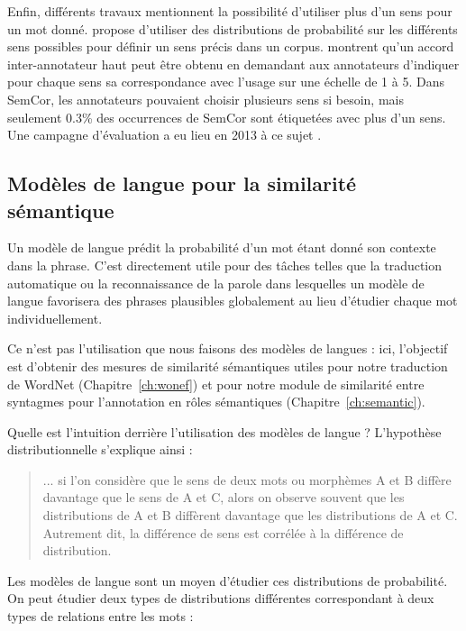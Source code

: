 Enfin, différents travaux mentionnent la possibilité d'utiliser plus d'un sens
pour un mot donné. \cite{smith2011rumble} propose d'utiliser des distributions
de probabilité sur les différents sens possibles pour définir un sens précis
dans un corpus. \cite{erk2013measuring} montrent qu'un accord inter-annotateur
haut peut être obtenu en demandant aux annotateurs d'indiquer pour chaque sens
sa correspondance avec l'usage sur une échelle de 1 à 5. Dans SemCor, les
annotateurs pouvaient choisir plusieurs sens si besoin, mais seulement 0.3\%
des occurrences de SemCor sont étiquetées avec plus d'un sens. Une campagne
d'évaluation a eu lieu en 2013 à ce sujet \citep{jurgens2013semeval}.

\subsection{Modèles de langue pour la similarité sémantique}
\label{subsec:modeles_de_langue}

Un modèle de langue prédit la probabilité d'un mot étant donné son contexte
dans la phrase. C'est directement utile pour des tâches telles que la
traduction automatique ou la reconnaissance de la parole dans lesquelles un
modèle de langue favorisera des phrases plausibles globalement au lieu
d'étudier chaque mot individuellement.

Ce n'est pas l'utilisation que nous faisons des modèles de langues : ici,
l'objectif est d'obtenir des mesures de similarité sémantiques utiles pour
notre traduction de WordNet (Chapitre~\ref{ch:wonef}) et pour notre module de
similarité entre syntagmes pour l'annotation en rôles sémantiques
(Chapitre~\ref{ch:semantic}).

Quelle est l'intuition derrière l'utilisation des modèles de langue ?
L'hypothèse distributionnelle s'explique ainsi
\cite[p.~786]{harris1954distributional} :

\begin{quote} ... si l'on considère que le sens de deux mots ou morphèmes A et B
    diffère davantage que le sens de A et C, alors on observe souvent que les
    distributions de A et B diffèrent davantage que les distributions de A et C.
    Autrement dit, la différence de sens est corrélée à la différence de
    distribution. \end{quote}

Les modèles de langue sont un moyen d'étudier ces distributions de probabilité.
On peut étudier deux types de distributions différentes correspondant à deux
types de relations entre les mots \citep{sahlgren2008distributional} :

